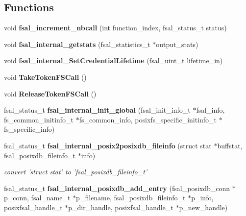 \subsection*{Functions}
\begin{DoxyCompactItemize}
\item 
void {\bf fsal\_\-increment\_\-nbcall} (int function\_\-index, fsal\_\-status\_\-t status)
\item 
void {\bf fsal\_\-internal\_\-getstats} (fsal\_\-statistics\_\-t $\ast$output\_\-stats)
\item 
void {\bf fsal\_\-internal\_\-SetCredentialLifetime} (fsal\_\-uint\_\-t lifetime\_\-in)
\item 
void {\bf TakeTokenFSCall} ()
\item 
void {\bfseries ReleaseTokenFSCall} ()\label{fsal__internal_8c_a3ebf10f203cc6b718170d47f661b101a}

\item 
fsal\_\-status\_\-t {\bfseries fsal\_\-internal\_\-init\_\-global} (fsal\_\-init\_\-info\_\-t $\ast$fsal\_\-info, fs\_\-common\_\-initinfo\_\-t $\ast$fs\_\-common\_\-info, posixfs\_\-specific\_\-initinfo\_\-t $\ast$fs\_\-specific\_\-info)\label{fsal__internal_8c_a5368991d770408ef926c5bcfbb969757}

\item 
fsal\_\-status\_\-t {\bf fsal\_\-internal\_\-posix2posixdb\_\-fileinfo} (struct stat $\ast$buffstat, fsal\_\-posixdb\_\-fileinfo\_\-t $\ast$info)
\begin{DoxyCompactList}\small\item\em convert 'struct stat' to 'fsal\_\-posixdb\_\-fileinfo\_\-t' \item\end{DoxyCompactList}\item 
fsal\_\-status\_\-t {\bfseries fsal\_\-internal\_\-posixdb\_\-add\_\-entry} (fsal\_\-posixdb\_\-conn $\ast$p\_\-conn, fsal\_\-name\_\-t $\ast$p\_\-filename, fsal\_\-posixdb\_\-fileinfo\_\-t $\ast$p\_\-info, posixfsal\_\-handle\_\-t $\ast$p\_\-dir\_\-handle, posixfsal\_\-handle\_\-t $\ast$p\_\-new\_\-handle)\label{fsal__internal_8c_ae80fa36dfdc140b063b33f213eb9a817}


\end{DoxyCompactItemize}

